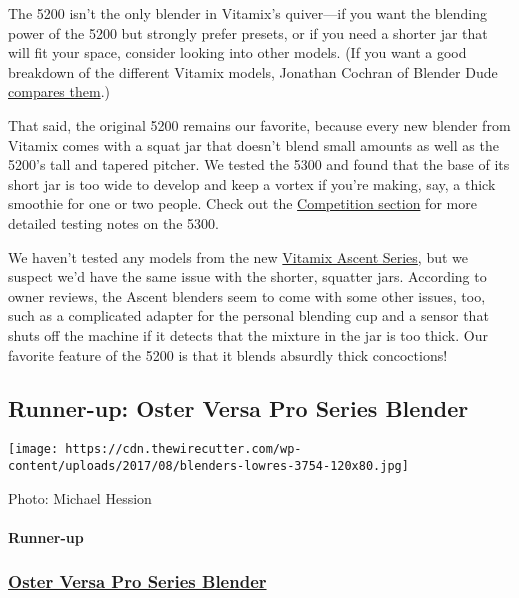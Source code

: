 The 5200 isn't the only blender in Vitamix's quiver---if you want the
blending power of the 5200 but strongly prefer presets, or if you need a
shorter jar that will fit your space, consider looking into other
models. (If you want a good breakdown of the different Vitamix models,
Jonathan Cochran of Blender Dude
\href{http://blenderdude.com/articles/vitamix-models/}{compares them}.)

That said, the original 5200 remains our favorite, because every new
blender from Vitamix comes with a squat jar that doesn't blend small
amounts as well as the 5200's tall and tapered pitcher. We tested the
5300 and found that the base of its short jar is too wide to develop and
keep a vortex if you're making, say, a thick smoothie for one or two
people. Check out the \protect\hyperlink{the-competition}{Competition
section} for more detailed testing notes on the 5300.

We haven't tested any models from the new
\href{https://www.vitamix.com/us/en_us/shop/smart-system-blenders}{Vitamix
Ascent Series}, but we suspect we'd have the same issue with the
shorter, squatter jars. According to owner reviews, the Ascent blenders
seem to come with some other issues, too, such as a complicated adapter
for the personal blending cup and a sensor that shuts off the machine if
it detects that the mixture in the jar is too thick. Our favorite
feature of the 5200 is that it blends absurdly thick concoctions!

\hypertarget{runner-up-oster-versa-pro-series-blender}{%
\subsection{Runner-up: Oster Versa Pro Series
Blender}\label{runner-up-oster-versa-pro-series-blender}}

\texttt{[image: https://cdn.thewirecutter.com/wp-content/uploads/2017/08/blenders-lowres-3754-120x80.jpg]}

Photo: Michael Hession

\hypertarget{runner-up-2}{%
\paragraph{Runner-up}\label{runner-up-2}}

\href{https://www.nytimes3xbfgragh.onion/wirecutter/out/link/3754/162049/4/109195?merchant=Amazon}{}

\hypertarget{oster-versa-pro-series-blender-2}{%
\subsubsection{\texorpdfstring{\href{https://www.nytimes3xbfgragh.onion/wirecutter/out/link/3754/162049/4/109195?merchant=Amazon}{Oster
Versa Pro Series
Blender}}{Oster Versa Pro Series Blender}}\label{oster-versa-pro-series-blender-2}}

